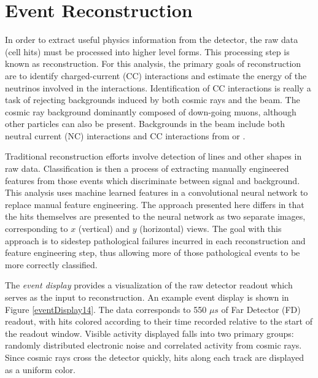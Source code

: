 \chapter{Event Reconstruction}
\label{reconstruction_chapter}

In order to extract useful physics information from the \nova detector, the raw
data (cell hits) must be processed into higher level forms.
This processing step is known as reconstruction.
For this analysis, the primary goals of reconstruction are to identify \numu
charged-current (CC) interactions and estimate the energy of the neutrinos involved in the interactions. Identification of \numu CC interactions is really
a task of rejecting backgrounds induced by both cosmic rays and the \numi beam.  The cosmic ray background dominantly composed of down-going muons,
although other particles can also be present.  Backgrounds in the \numi beam
include both neutral current (NC) interactions and CC interactions from \nue or
\nutau.

Traditional reconstruction efforts involve detection of lines and other shapes
in raw data.  Classification is then a process of extracting manually
engineered features from those events which discriminate between signal and
background.
This analysis uses machine learned features in a convolutional neural network
to replace manual feature engineering.
The approach presented here differs in that the hits themselves are presented
to the neural network as two separate images, corresponding to $x$ (vertical)
and $y$ (horizontal) views.
The goal with this approach is to sidestep pathological failures incurred in each reconstruction and feature engineering step, thus allowing more of those pathological events to be more correctly classified.

The \nova \textit{event display} provides a visualization of the raw detector readout which serves as the input to reconstruction.
An example event display is shown in Figure \ref{eventDisplay14}.
The data corresponds to 550 $\mu s$ of Far Detector (FD) readout, with hits colored according to their time recorded relative to the start of the readout window.
Visible activity displayed falls into two primary groups: randomly distributed electronic noise and correlated activity from cosmic rays.
Since cosmic rays cross the detector quickly, hits along each track are displayed as a uniform color.

